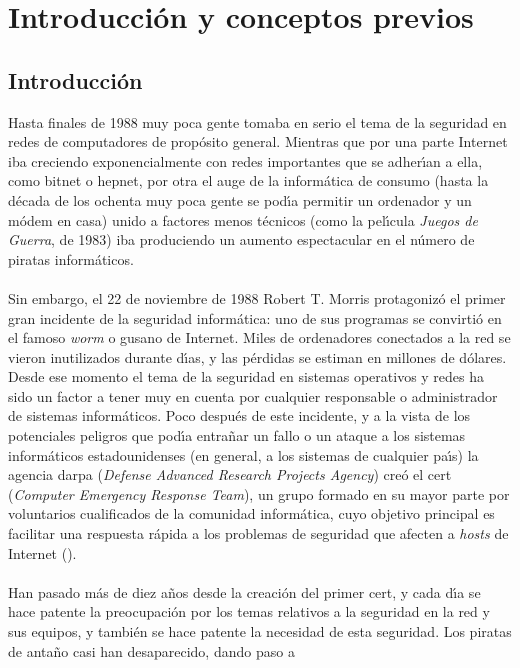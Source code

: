 \chapter{Introducci\'on y conceptos previos}
\section{Introducci\'on}
Hasta finales de 1988 muy poca gente tomaba en serio el tema de la seguridad en
redes de computadores de prop\'osito general. Mientras que por una parte 
Internet iba 
creciendo exponencialmente con redes importantes que se adher\'{\i}an a ella, 
como {\sc bitnet} o {\sc hepnet}, por otra el auge de la inform\'atica de 
consumo (hasta la d\'ecada de los ochenta muy poca gente se pod\'{\i}a permitir
un ordenador y un m\'odem en casa) unido a factores menos t\'ecnicos (como la
pel\'{\i}cula {\it Juegos de Guerra}, de 1983) iba produciendo un aumento 
espectacular en el n\'umero de piratas inform\'aticos.\\
\\Sin embargo, el 22 de noviembre de 1988 Robert T. Morris protagoniz\'o el
primer gran incidente de la seguridad inform\'atica: uno de sus programas se
convirti\'o en el famoso {\it worm} o gusano de Internet. Miles de ordenadores
conectados a la red se vieron inutilizados durante d\'{\i}as, y las p\'erdidas 
se estiman en millones de d\'olares. Desde ese momento el tema de la seguridad 
en sistemas operativos y redes ha sido un factor a tener muy en cuenta por 
cualquier responsable o administrador de sistemas inform\'aticos.
Poco despu\'es de este incidente, y a la vista de los potenciales peligros que
pod\'{\i}a entra\~nar un fallo o un ataque a los sistemas inform\'aticos 
estadounidenses (en general, a los sistemas de cualquier pa\'{\i}s) la agencia
{\sc darpa} ({\it Defense Advanced Research Projects Agency}) cre\'o el {\sc 
cert} ({\it Computer Emergency Response Team}), un grupo formado en su mayor
parte por voluntarios cualificados de la comunidad inform\'atica, cuyo objetivo
principal es facilitar una respuesta r\'apida a los problemas de seguridad que
afecten a {\it hosts} de Internet (\cite{kn:den90}).\\
\\Han pasado m\'as de diez a\~nos desde la creaci\'on del primer {\sc cert}, y
cada d\'{\i}a se hace patente la preocupaci\'on por los temas relativos a la
seguridad en la red y sus equipos, y tambi\'en se hace patente la necesidad de
esta seguridad. Los piratas de anta\~no casi han desaparecido, dando paso a
